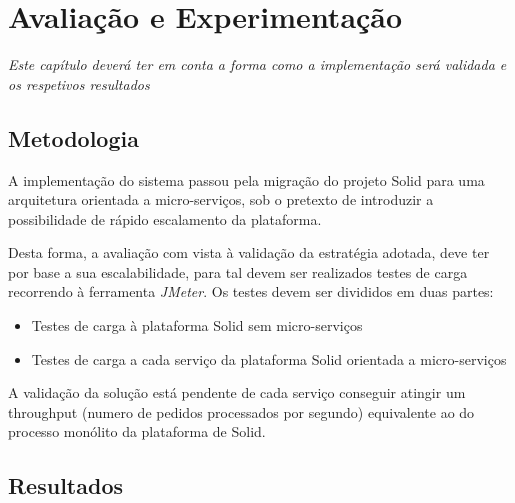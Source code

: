 
\chapter{Avaliação e Experimentação}
\label{cap:6}
\emph{Este capítulo deverá ter em conta a forma como a implementação será validada e os respetivos resultados}

\section{Metodologia}

A implementação do sistema passou pela migração do projeto Solid para uma arquitetura orientada a micro-serviços, sob o pretexto de introduzir a possibilidade de rápido escalamento da plataforma.

Desta forma, a avaliação com vista à validação da estratégia adotada, deve ter por base a sua escalabilidade, para tal devem ser realizados testes de carga recorrendo à ferramenta \emph{JMeter}. Os testes devem ser divididos em duas partes:
\begin{itemize}
    \item Testes de carga à plataforma Solid sem micro-serviços
    \item Testes de carga a cada serviço da plataforma Solid orientada a micro-serviços
\end{itemize}

A validação da solução está pendente de cada serviço conseguir atingir um throughput (numero de pedidos processados por segundo) equivalente ao do processo monólito da plataforma de Solid.

\section{Resultados}